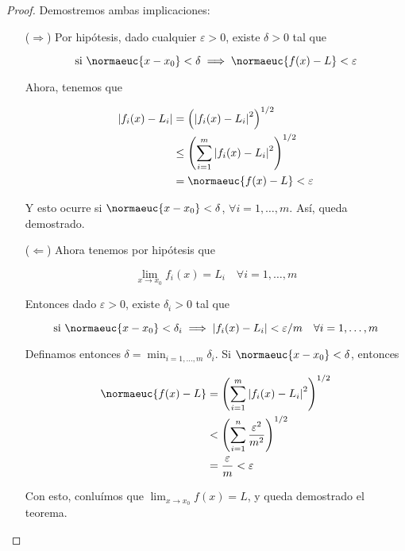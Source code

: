 \begin{proof}
    Demostremos ambas implicaciones:
    
    \begin{enumerate}
        \item[($\Rightarrow$)] Por hipótesis, dado cualquier $\varepsilon > 0$, existe $\delta > 0$ tal que
        
        \[
        \text{si $\normaeuc{x - x_0} < \delta$} \implies \normaeuc{f(x) - L} < \varepsilon
        \]
        
        Ahora, tenemos que
        
        \begin{align*}
            \left| f_i(x) - L_i \right| &=  \left( \left| f_i(x) - L_i \right|^2 \right)^{1/2} \\
            &\leq \left( \sum_{i=1}^m \left| f_i(x) - L_i \right|^2 \right)^{1/2} \\
            &= \normaeuc{f(x) - L} < \varepsilon
        \end{align*}
        
        Y esto ocurre si $\normaeuc{x-x_0} < \delta$, $\forall i = 1, \dots, m$. Así, queda demostrado.
        
        \item[($\Leftarrow$)] Ahora tenemos por hipótesis que
        
        \[
        \lim_{x \to x_0} f_i(x) = L_i \quad \forall i = 1, \dots, m
        \]
        
        Entonces dado $\varepsilon > 0$, existe $\delta_i > 0$ tal que
        
        \[
        \text{si $\normaeuc{x - x_0} < \delta_i$} \implies \left| f_i(x) - L_i \right| < \varepsilon/m \quad \forall i=1,\dots,m
        \]
        
        Definamos entonces $\delta = \min_{i=1,\dots,m} \delta_i$. Si $\normaeuc{x-x_0} < \delta$, entonces
        
        \begin{align*}
            \normaeuc{f(x) - L} &= \left( \sum_{i=1}^m \left| f_i(x) - L_i \right|^2 \right)^{1/2} \\
            &< \left(\sum_{i=1}^n \frac{\varepsilon^2}{m^2} \right)^{1/2} \\
            &= \frac{\varepsilon}{m} < \varepsilon
        \end{align*}
        
        Con esto, conluímos que $\lim_{x \to x_0} f(x) = L$, y queda demostrado el teorema.
    \end{enumerate}
\end{proof}

